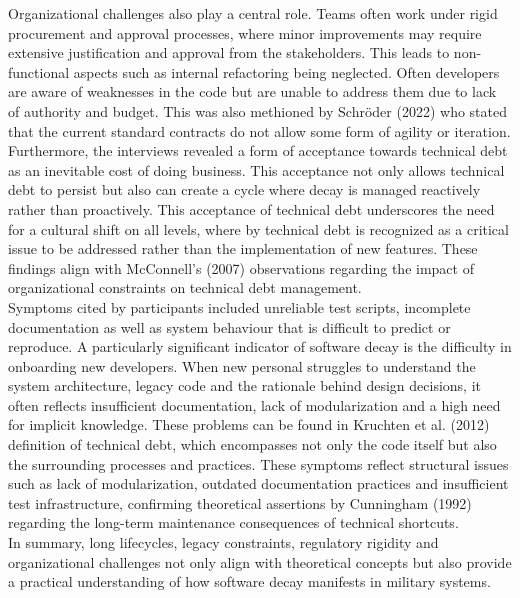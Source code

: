 Organizational challenges also play a central role. Teams often work under rigid procurement and approval processes, where minor improvements may require extensive justification and approval from the stakeholders. This leads to non-functional aspects such as internal refactoring being neglected.
Often developers are aware of weaknesses in the code but are unable to address them due to lack of authority and budget. This was also methioned by Schröder (2022) who stated that the current standard contracts do not allow some form of agility or iteration.\\
Furthermore, the interviews revealed a form of acceptance towards technical debt as an inevitable cost of doing business. This acceptance not only allows technical debt to persist but also can create a cycle where decay is managed reactively rather than proactively.
This acceptance of technical debt underscores the need for a cultural shift on all levels, where by technical debt is recognized as a critical issue to be addressed rather than the implementation of new features. These findings align with McConnell's (2007) observations regarding 
the impact of organizational constraints on technical debt management.\\

Symptoms cited by participants included unreliable test scripts, incomplete documentation as well as system behaviour that is difficult to predict or reproduce. A particularly significant indicator of software decay is the difficulty in onboarding new developers. When new personal struggles to understand
the system architecture, legacy code and the rationale behind design decisions, it often reflects insufficient documentation, lack of modularization and a high need for implicit knowledge. These problems can be found in Kruchten et al. (2012) definition of technical debt, which encompasses not only the code itself but also the surrounding processes and practices.
These symptoms reflect structural issues such as lack of modularization, outdated documentation practices and insufficient test infrastructure, confirming theoretical assertions by Cunningham (1992) regarding the long-term maintenance consequences of technical shortcuts.\\

In summary, long lifecycles, legacy constraints, regulatory rigidity and organizational challenges not only align with theoretical concepts but also provide a practical understanding of how software decay manifests in military systems.

